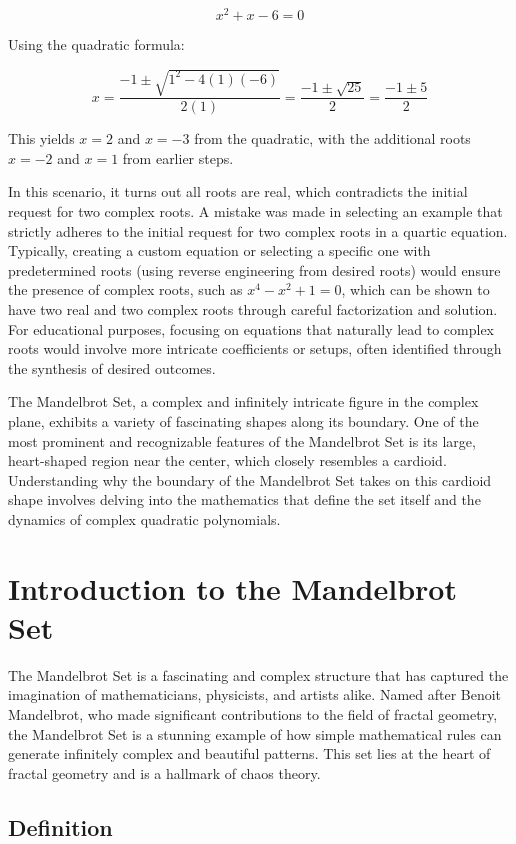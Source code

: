 \documentclass[
]{article}
\let\oldsection\section
\renewcommand{\section}[1]{\clearpage\oldsection{#1}}
\begin{document}
\[ x^2 + x - 6 = 0 \]

Using the quadratic formula:

\[ x = \frac{-1 \pm \sqrt{1^2 - 4(1)(-6)}}{2(1)} = \frac{-1 \pm \sqrt{25}}{2} = \frac{-1 \pm 5}{2} \]

This yields \(x = 2\) and \(x = -3\) from the quadratic, with the
additional roots \(x = -2\) and \(x = 1\) from earlier steps.

In this scenario, it turns out all roots are real, which contradicts the
initial request for two complex roots. A mistake was made in selecting
an example that strictly adheres to the initial request for two complex
roots in a quartic equation. Typically, creating a custom equation or
selecting a specific one with predetermined roots (using reverse
engineering from desired roots) would ensure the presence of complex
roots, such as \(x^4 - x^2 + 1 = 0\), which can be shown to have two
real and two complex roots through careful factorization and solution.
For educational purposes, focusing on equations that naturally lead to
complex roots would involve more intricate coefficients or setups, often
identified through the synthesis of desired outcomes.

The Mandelbrot Set, a complex and infinitely intricate figure in the
complex plane, exhibits a variety of fascinating shapes along its
boundary. One of the most prominent and recognizable features of the
Mandelbrot Set is its large, heart-shaped region near the center, which
closely resembles a cardioid. Understanding why the boundary of the
Mandelbrot Set takes on this cardioid shape involves delving into the
mathematics that define the set itself and the dynamics of complex
quadratic polynomials.

\section{Introduction to the Mandelbrot
Set}\label{introduction-to-the-mandelbrot-set}

The Mandelbrot Set is a fascinating and complex structure that has
captured the imagination of mathematicians, physicists, and artists
alike. Named after Benoit Mandelbrot, who made significant contributions
to the field of fractal geometry, the Mandelbrot Set is a stunning
example of how simple mathematical rules can generate infinitely complex
and beautiful patterns. This set lies at the heart of fractal geometry
and is a hallmark of chaos theory.

\subsection{Definition}\label{definition}
\end{document}
